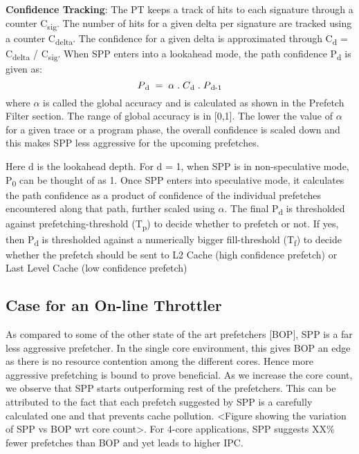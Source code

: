 \documentclass{sig-alternate}
\begin{document}
\textbf{Confidence Tracking}: The PT keeps a track of hits to each signature through a counter C\textsubscript{sig}. The number of hits for a given delta per signature are tracked using a counter C\textsubscript{delta}. The confidence for a given delta is approximated through C\textsubscript{d} = C\textsubscript{delta} / C\textsubscript{sig}. When SPP enters into a lookahead mode, the path confidence P\textsubscript{d} is given as:
$$P\textsubscript{d} \;=\; \alpha  \;.\;  C\textsubscript{d}  \;.\;  P\textsubscript{d-1}$$ where $\alpha$ is called the global accuracy and is calculated as shown in the Prefetch Filter section. The range of global accuracy is in [0,1]. The lower the value of $\alpha$ for a given trace or a program phase, the overall confidence is scaled down and this makes SPP less aggressive for the upcoming prefetches.

Here d is the lookahead depth. For d = 1, when SPP is in non-speculative mode, P\textsubscript{0} can be thought of as 1. Once SPP enters into speculative mode, it calculates the path confidence as a product of confidence of the individual prefetches encountered along that path, further scaled using $\alpha$. The final P\textsubscript{d} is thresholded against prefetching-threshold (T\textsubscript{p}) to decide whether to prefetch or not. If yes, then P\textsubscript{d} is thresholded against a numerically bigger fill-threshold (T\textsubscript{f}) to decide whether the prefetch should be sent to L2 Cache (high confidence prefetch) or Last Level Cache (low confidence prefetch)

\subsection{Case for an On-line Throttler}
As compared to some of the other state of the art prefetchers [BOP], SPP is a far less aggressive prefetcher. In the single core environment, this gives BOP an edge as there is no resource contention among the different cores. Hence more aggressive prefetching is bound to prove beneficial. As we increase the core count, we observe that SPP starts outperforming rest of the prefetchers. This can be attributed to the fact that each prefetch suggested by SPP is a carefully calculated one and that prevents cache pollution. <Figure showing the variation of SPP vs BOP wrt core count>. For 4-core applications, SPP suggests XX\% fewer prefetches than BOP and yet leads to higher IPC.
\end{document}
